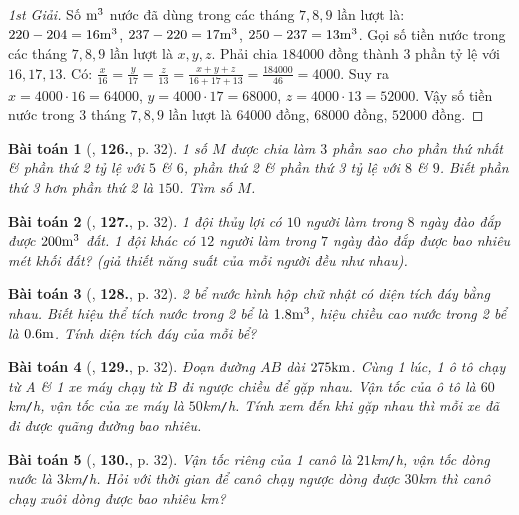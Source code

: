 \documentclass{article}
\newtheorem{baitoan}{Bài toán}
\begin{document}
\begin{proof}[1st Giải]
	Số $\rm m^3$ nước đã dùng trong các tháng $7,8,9$ lần lượt là: $220 - 204 = 16\rm m^3$, $237 - 220 = 17\rm m^3$, $250 - 237 = 13\rm m^3$. Gọi số tiền nước trong các tháng $7,8,9$ lần lượt là $x,y,z$. Phải chia $184000$ đồng thành 3 phần tỷ lệ với $16,17,13$. Có: $\frac{x}{16} = \frac{y}{17} = \frac{z}{13} = \frac{x + y + z}{16 + 17 + 13} = \frac{184000}{46} = 4000$. Suy ra $x = 4000\cdot16 = 64000$, $y = 4000\cdot17 = 68000$, $z = 4000\cdot13 = 52000$. Vậy số tiền nước trong 3 tháng $7,8,9$ lần lượt là $64000$ đồng, $68000$ đồng, $52000$ đồng.
\end{proof}

\begin{baitoan}[\cite{Tuyen_Toan_7}, \textbf{126.}, p. 32]
	1 số $M$ được chia làm $3$ phần sao cho phần thứ nhất \& phần thứ 2 tỷ lệ với $5$ \& $6$, phần thứ 2 \& phần thứ 3 tỷ lệ với $8$ \& $9$. Biết phần thứ 3 hơn phần thứ 2 là $150$. Tìm số $M$.
\end{baitoan}
	
\begin{baitoan}[\cite{Tuyen_Toan_7}, \textbf{127.}, p. 32]
	1 đội thủy lợi có $10$ người làm trong $8$ ngày đào đắp được $\rm200m^3$ đất. 1 đội khác có $12$ người làm trong $7$ ngày đào đắp được bao nhiêu mét khối đất? (giả thiết năng suất của mỗi người đều như nhau).
\end{baitoan}

\begin{baitoan}[\cite{Tuyen_Toan_7}, \textbf{128.}, p. 32]
	2 bể nước hình hộp chữ nhật có diện tích đáy bằng nhau. Biết hiệu thể tích nước trong 2 bể là $\rm1.8m^3$, hiệu chiều cao nước trong 2 bể là $\rm0.6m$. Tính diện tích đáy của mỗi bể?
\end{baitoan}

\begin{baitoan}[\cite{Tuyen_Toan_7}, \textbf{129.}, p. 32]
	Đoạn đường $AB$ dài $\rm275km$. Cùng 1 lúc, 1 ô tô chạy từ A \& 1 xe máy chạy từ B đi ngược chiều để gặp nhau. Vận tốc của ô tô là $60$\emph{km\texttt{/}h}, vận tốc của xe máy là $50$\emph{km\texttt{/}h}. Tính xem đến khi gặp nhau thì mỗi xe đã đi được quãng đường bao nhiêu.
\end{baitoan}

\begin{baitoan}[\cite{Tuyen_Toan_7}, \textbf{130.}, p. 32]
	Vận tốc riêng của 1 canô là $21$\emph{km\texttt{/}h}, vận tốc dòng nước là $3$\emph{km\texttt{/}h}. Hỏi với thời gian để canô chạy ngược dòng được $30$\emph{km} thì canô chạy xuôi dòng được bao nhiêu \emph{km}?
\end{baitoan}
\end{document}
